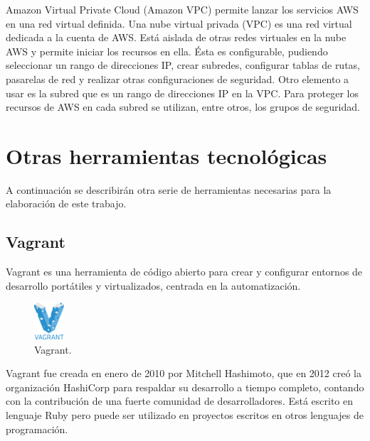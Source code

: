 Amazon Virtual Private Cloud (Amazon VPC) permite lanzar los servicios AWS en una red virtual definida. Una nube virtual privada (VPC) es una red virtual dedicada a la cuenta de AWS. Está aislada de otras redes virtuales en la nube AWS y permite iniciar los recursos en ella. Ésta es configurable, pudiendo seleccionar un rango de direcciones IP, crear subredes, configurar tablas de rutas, pasarelas de red y realizar otras configuraciones de seguridad. Otro elemento a usar es la subred que es un rango de direcciones IP en la VPC. Para proteger los recursos de AWS en cada subred se utilizan, entre otros, los grupos de seguridad.

\section{Otras herramientas tecnológicas}

A continuación se describirán otra serie de herramientas necesarias para la elaboración de este trabajo.

\subsection{Vagrant}

Vagrant es una herramienta de código abierto para crear y configurar entornos de desarrollo portátiles y virtualizados, centrada en la automatización.

\begin{figure}[H]
\centering
\includegraphics[width=0.1\textwidth]{images/figures/vagrant.png}
\caption{Vagrant.\footnotemark}
\end{figure}


Vagrant fue creada en enero de 2010 por Mitchell Hashimoto, que en 2012 creó la organización HashiCorp para respaldar su desarrollo a tiempo completo, contando con la contribución de una fuerte comunidad de desarrolladores. Está escrito en lenguaje Ruby pero puede ser utilizado en proyectos escritos en otros lenguajes de programación.

